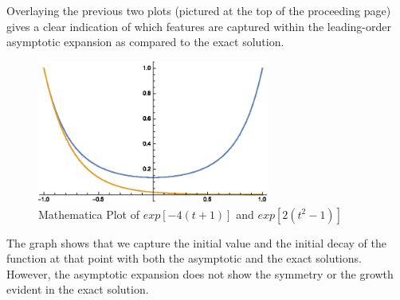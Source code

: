 Overlaying the previous two plots (pictured at the top of the proceeding page) gives a clear indication of which features are captured within the leading-order asymptotic expansion as compared to the exact solution.
\begin{figure}[t]
\centering
\includegraphics[width=3in]{ass3no1prta3}
\caption{Mathematica Plot of $exp[-4(t+1)]$ and $exp[2(t^2-1)]$}
\end{figure}
The graph shows that we capture the initial value and the initial decay of the function at that point with both the asymptotic and the exact solutions. However, the asymptotic expansion does not show the symmetry or the growth evident in the exact solution.
\pagebreak

